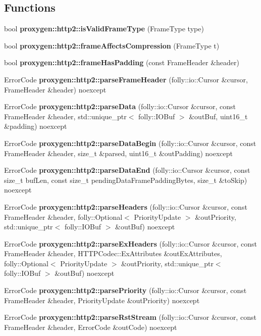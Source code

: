 \subsection*{Functions}
\begin{DoxyCompactItemize}
\item 
bool {\bf proxygen\+::http2\+::is\+Valid\+Frame\+Type} (Frame\+Type type)
\item 
bool {\bf proxygen\+::http2\+::frame\+Affects\+Compression} (Frame\+Type t)
\item 
bool {\bf proxygen\+::http2\+::frame\+Has\+Padding} (const Frame\+Header \&header)
\item 
Error\+Code {\bf proxygen\+::http2\+::parse\+Frame\+Header} (folly\+::io\+::\+Cursor \&cursor, Frame\+Header \&header) noexcept
\item 
Error\+Code {\bf proxygen\+::http2\+::parse\+Data} (folly\+::io\+::\+Cursor \&cursor, const Frame\+Header \&header, std\+::unique\+\_\+ptr$<$ folly\+::\+I\+O\+Buf $>$ \&out\+Buf, uint16\+\_\+t \&padding) noexcept
\item 
Error\+Code {\bf proxygen\+::http2\+::parse\+Data\+Begin} (folly\+::io\+::\+Cursor \&cursor, const Frame\+Header \&header, size\+\_\+t \&parsed, uint16\+\_\+t \&out\+Padding) noexcept
\item 
Error\+Code {\bf proxygen\+::http2\+::parse\+Data\+End} (folly\+::io\+::\+Cursor \&cursor, const size\+\_\+t buf\+Len, const size\+\_\+t pending\+Data\+Frame\+Padding\+Bytes, size\+\_\+t \&to\+Skip) noexcept
\item 
Error\+Code {\bf proxygen\+::http2\+::parse\+Headers} (folly\+::io\+::\+Cursor \&cursor, const Frame\+Header \&header, folly\+::\+Optional$<$ Priority\+Update $>$ \&out\+Priority, std\+::unique\+\_\+ptr$<$ folly\+::\+I\+O\+Buf $>$ \&out\+Buf) noexcept
\item 
Error\+Code {\bf proxygen\+::http2\+::parse\+Ex\+Headers} (folly\+::io\+::\+Cursor \&cursor, const Frame\+Header \&header, H\+T\+T\+P\+Codec\+::\+Ex\+Attributes \&out\+Ex\+Attributes, folly\+::\+Optional$<$ Priority\+Update $>$ \&out\+Priority, std\+::unique\+\_\+ptr$<$ folly\+::\+I\+O\+Buf $>$ \&out\+Buf) noexcept
\item 
Error\+Code {\bf proxygen\+::http2\+::parse\+Priority} (folly\+::io\+::\+Cursor \&cursor, const Frame\+Header \&header, Priority\+Update \&out\+Priority) noexcept
\item 
Error\+Code {\bf proxygen\+::http2\+::parse\+Rst\+Stream} (folly\+::io\+::\+Cursor \&cursor, const Frame\+Header \&header, Error\+Code \&out\+Code) noexcept

\end{DoxyCompactItemize}
